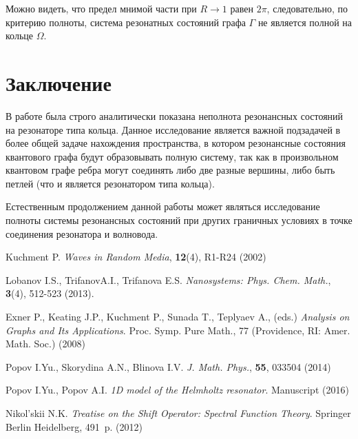 \documentclass{nsart_eng}
\begin{document}
Можно видеть, что предел мнимой части при $R \to 1$ равен $2 \pi$, следовательно, по критерию полноты, система резонатных состояний графа $\Gamma$ не является полной на кольце $\Omega$.


\section{Заключение}
В работе была строго аналитически показана неполнота резонансных состояний на резонаторе типа кольца. Данное исследование является важной подзадачей в более общей задаче нахождения пространства, в котором резонансные состояния квантового графа будут образовывать полную систему, так как в произвольном квантовом графе ребра могут соединять либо две разные вершины, либо быть петлей (что и является резонатором типа кольца).

Естественным продолжением данной работы может являться исследование полноты системы резонансных состояний при других граничных условиях в точке соединения резонатора и волновода.


\begin{thebibliography}{99}
 Kuchment P. \textit{Waves in Random Media}, \textbf{12}(4), R1-R24 (2002)

 Lobanov I.S., TrifanovA.I., Trifanova E.S. \textit{Nanosystems: Phys. Chem. Math.}, \textbf{3}(4), 512-523 (2013).

 Exner P., Keating J.P., Kuchment P., Sunada T., Teplyaev A., (eds.) \textit{Analysis on Graphs and Its Applications}. Proc. Symp. Pure Math., 77 (Providence, RI: Amer. Math. Soc.) (2008)

 Popov I.Yu., Skorydina A.N., Blinova I.V. \textit{J. Math. Phys.}, \textbf{55}, 033504 (2014)

 Popov I.Yu., Popov A.I. {\it 1D model of the Helmholtz resonator}. Manuscript (2016)

 Nikol'skii N.K. {\it Treatise on the Shift Operator: Spectral Function Theory}.  Springer Berlin Heidelberg,  491~p. (2012)

\end{thebibliography}
\end{document}
